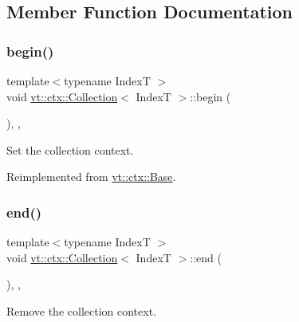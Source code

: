 \subsection{Member Function Documentation}
\mbox{\label{structvt_1_1ctx_1_1_collection_a1555355c83dd6f692c03c66882b74846}} 
\subsubsection{\texorpdfstring{begin()}{begin()}}
{\footnotesize\ttfamily template$<$typename IndexT $>$ \\
void \hyperlink{structvt_1_1ctx_1_1_collection}{vt\+::ctx\+::\+Collection}$<$ IndexT $>$\+::begin (\begin{DoxyParamCaption}{ }\end{DoxyParamCaption})\hspace{0.3cm}{\ttfamily [final]}, {\ttfamily [override]}, {\ttfamily [virtual]}}



Set the collection context. 



Reimplemented from \hyperlink{structvt_1_1ctx_1_1_base_aab5524952e1bb163ccba5df64a303168}{vt\+::ctx\+::\+Base}.

\mbox{\label{structvt_1_1ctx_1_1_collection_afbbbbaa3a85469b7ddded1ded70bd83d}} 
\subsubsection{\texorpdfstring{end()}{end()}}
{\footnotesize\ttfamily template$<$typename IndexT $>$ \\
void \hyperlink{structvt_1_1ctx_1_1_collection}{vt\+::ctx\+::\+Collection}$<$ IndexT $>$\+::end (\begin{DoxyParamCaption}{ }\end{DoxyParamCaption})\hspace{0.3cm}{\ttfamily [final]}, {\ttfamily [override]}, {\ttfamily [virtual]}}



Remove the collection context. 



